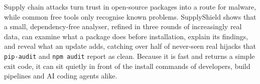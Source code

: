 \documentclass[runningheads]{llncs}
\begin{document}
Supply chain attacks turn trust in open-source packages into a route for malware, while common free tools only recognise known problems. SupplyShield shows that a small, dependency-free analyser, refined in three rounds of increasingly real data, can examine what a package does before installation, explain its findings, and reveal what an update adds, catching over half of never-seen real hijacks that \texttt{pip-audit} and \texttt{npm audit} report as clean. Because it is fast and returns a simple exit code, it can sit quietly in front of the install commands of developers, build pipelines and AI coding agents alike.



\end{document}
